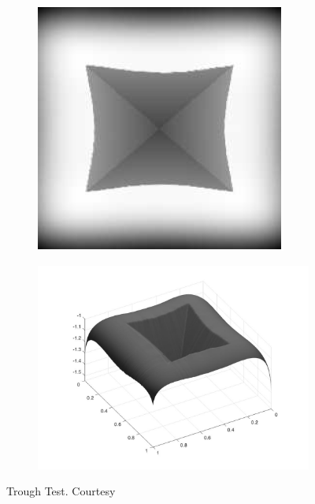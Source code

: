 \documentclass{article}[11pt]
\begin{document}
\begin{figure}[h!]
	\begin{subfigure}{0.5\textwidth}
		\centering
		\includegraphics[scale = 0.52]{thing1.png}
	\end{subfigure}
	\begin{subfigure}{0.5\textwidth}
		\includegraphics[scale = 0.17]{thing1.jpg}
	\end{subfigure}
	\caption{Trough Test. Courtesy \cite{prados}}
	\label{fig:2}
\end{figure}
\end{document}
